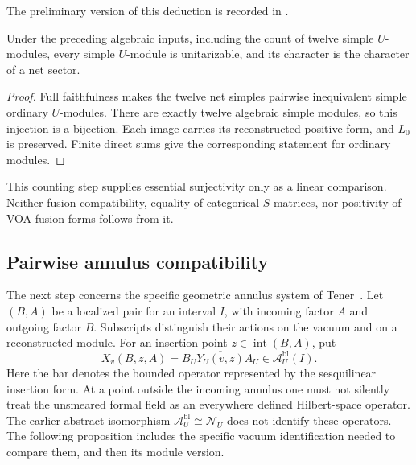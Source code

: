 The preliminary version of this deduction is recorded in
.

\begin{proposition}
\label{prop:analytic-strong-unitarity}
Under the preceding algebraic inputs, including the count of twelve
simple $U$-modules, every simple $U$-module is
unitarizable, and its character is the character of a net sector.
\end{proposition}
\begin{proof}
Full faithfulness makes the twelve net simples pairwise inequivalent
simple ordinary $U$-modules.  There are exactly twelve algebraic simple
modules, so this injection is a bijection.  Each image carries its
reconstructed positive form, and $L_0$ is preserved.  Finite direct sums
give the corresponding statement for ordinary modules.
\end{proof}

This counting step supplies essential surjectivity only as a linear
comparison.  Neither fusion compatibility, equality of categorical
$S$ matrices, nor positivity of VOA fusion forms follows from it.

\subsection{Pairwise annulus compatibility}
\label{subsec:analytic-annuli}

The next step concerns the specific geometric annulus system of
Tener~\cite[Definition~3.18 and Corollaries~3.20--3.22]{TenFields}.
Let $(B,A)$ be a localized pair for an interval $I$, with incoming
factor $A$ and outgoing factor $B$.  Subscripts distinguish their
actions on the vacuum and on a reconstructed module.  For an insertion
point $z\in\operatorname{int}(B,A)$, put
\[
 X_v(B,z,A)=\overline{B_UY_U(v,z)A_U}
       \in\mathcal A_U^{\mathrm{bl}}(I).
\]
Here the bar denotes the bounded operator represented by the
sesquilinear insertion form.  At a point outside the incoming annulus
one must not silently treat the unsmeared formal field as an everywhere
defined Hilbert-space operator.  The earlier abstract isomorphism
$\mathcal A_U^{\mathrm{bl}}\cong\mathcal N_U$ does not identify these
operators.  The following proposition includes the specific vacuum
identification needed to compare them, and then its module version.

